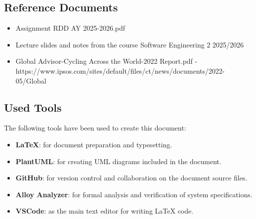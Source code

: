\subsection{Reference Documents}

\begin{itemize}
   \item Assignment RDD AY 2025-2026.pdf
   \item Lecture slides and notes from the course Software Engineering 2 2025/2026
   \item Global Advisor-Cycling Across the World-2022 Report.pdf - \newline https://www.ipsos.com/sites/default/files/ct/news/documents/2022-05/Global%
\end{itemize}

\subsection{Used Tools}
The following tools have been used to create this document:
\begin{itemize}
    \item \textbf{LaTeX}: for document preparation and typesetting.
    \item \textbf{PlantUML}: for creating UML diagrams included in the document.
    \item \textbf{GitHub}: for version control and collaboration on the document source files.
    \item \textbf{Alloy Analyzer}: for formal analysis and verification of system specifications.
    \item \textbf{VSCode}: as the main text editor for writing LaTeX code.
\end{itemize}
